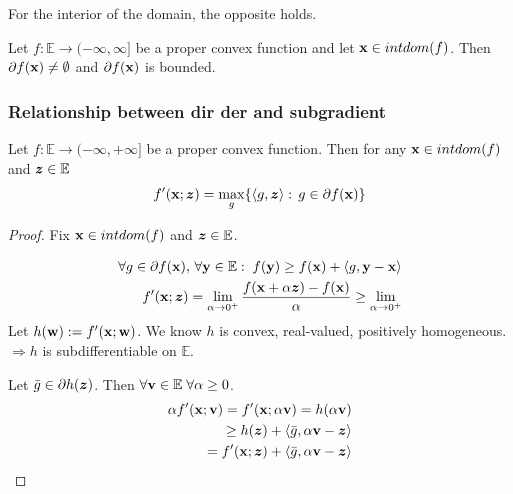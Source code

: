 \documentclass[11pt]{article}
\begin{document}
\begin{remark}
    For the interior of the domain, the opposite holds.
\end{remark}


\begin{theorem}
    Let $f: \mathbb{E} \to (-\infty,\infty]$ be a proper convex function and let ${\mathbf{x}} \in intdom(f)$.
    Then $\partial f({\mathbf{x}}) \neq \emptyset$ and $\partial f({\mathbf{x}})$ is bounded.
\end{theorem}


\subsubsection{Relationship between dir der and subgradient}
\begin{theorem}
    Let $f: \mathbb{E} \to (-\infty, +\infty]$ be a proper convex function. Then for any 
    ${\mathbf{x}} \in intdom(f)$ and ${\bm{z}} \in \mathbb{E}$
    \begin{align*}
        f'({\mathbf{x}}; {\bm{z}})  = \max_{g}\{ \langle g,{\bm{z}} \rangle: \, g \in \partial f({\mathbf{x}}) \}
    \end{align*}
\end{theorem}
\begin{proof}
    Fix ${\mathbf{x}} \in intdom(f)$ and ${\bm{z}} \in \mathbb{E}$.
    
    \begin{align*}
        \forall g \in \partial f({\mathbf{x}}),\, \forall {\mathbf{y}} \in \mathbb{E}: \; 
        f({\mathbf{y}}) \ge f({\mathbf{x}}) + \langle g, {\mathbf{y}}-{\mathbf{x}} \rangle\\
        f'({\mathbf{x}}; {\bm{z}}) = \lim_{\alpha \to 0^{+}} \frac{f({\mathbf{x}} + \alpha {\bm{z}}) - f({\mathbf{x}})}{\alpha} 
        \ge \lim_{\alpha \to 0^{+}}
    \end{align*}
    Let $h({\mathbf{w}}) := f'({\mathbf{x}}; {\mathbf{w}})$. We know $h$ is convex, real-valued, positively homogeneous. $\Longrightarrow h$ is 
    subdifferentiable on $\mathbb{E}$.

    Let $\bar{g} \in \partial h({\bm{z}})$. Then $\forall {\mathbf{v}} \in \mathbb{E} \; \forall \alpha \ge 0$.
    \begin{align*}
        \alpha f'({\mathbf{x}};{\mathbf{v}}) = f'({\mathbf{x}}; \alpha {\mathbf{v}}) = h(\alpha {\mathbf{v}}) \\
        \ge h({\bm{z}}) + \langle \bar{g}, \alpha {\mathbf{v}} - {\bm{z}} \rangle \\
        = f'({\mathbf{x}};{\bm{z}}) + \langle \bar{g}, \alpha {\mathbf{v}} - {\bm{z}} \rangle
    \end{align*}
\end{proof}

\end{document}
